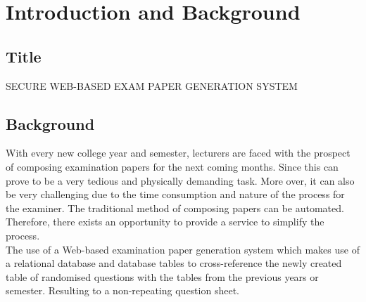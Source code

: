 

\chapter{Introduction and Background} \label{sec:introduction}

\section{Title}

SECURE WEB-BASED EXAM PAPER GENERATION SYSTEM

\section{Background}

With every new college year and semester, lecturers are faced with the prospect of composing examination papers for the next coming months. Since this can prove to be a very tedious and physically demanding task. More over, it can also be very challenging due to the time consumption and nature of the process for the examiner. The traditional method of composing papers can be automated. Therefore, there exists an opportunity to provide a service to simplify the process. \\
The use of a Web-based examination paper generation system which makes use of a relational database and database tables to cross-reference the newly created table of randomised questions with the tables from the previous years or semester. Resulting to a non-repeating question sheet.

